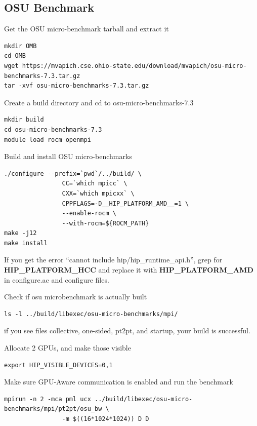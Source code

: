 \documentclass[
]{article}
\begin{document}
\hypertarget{osu-benchmark}{%
\subsection{OSU Benchmark}\label{osu-benchmark}}

Get the OSU micro-benchmark tarball and extract it

\begin{verbatim}
mkdir OMB
cd OMB
wget https://mvapich.cse.ohio-state.edu/download/mvapich/osu-micro-benchmarks-7.3.tar.gz
tar -xvf osu-micro-benchmarks-7.3.tar.gz
\end{verbatim}

Create a build directory and cd to osu-micro-benchmarks-7.3

\begin{verbatim}
mkdir build
cd osu-micro-benchmarks-7.3
module load rocm openmpi
\end{verbatim}

Build and install OSU micro-benchmarks

\begin{verbatim}
./configure --prefix=`pwd`/../build/ \
                CC=`which mpicc` \
                CXX=`which mpicxx` \
                CPPFLAGS=-D__HIP_PLATFORM_AMD__=1 \
                --enable-rocm \
                --with-rocm=${ROCM_PATH}
make -j12
make install
\end{verbatim}

If you get the error ``cannot include hip/hip\_runtime\_api.h'', grep
for \textbf{HIP\_PLATFORM\_HCC} and replace it with
\textbf{HIP\_PLATFORM\_AMD} in configure.ac and configure files.

Check if osu microbenchmark is actually built

\begin{verbatim}
ls -l ../build/libexec/osu-micro-benchmarks/mpi/
\end{verbatim}

if you see files collective, one-sided, pt2pt, and startup, your build
is successful.

Allocate 2 GPUs, and make those visible

\begin{verbatim}
export HIP_VISIBLE_DEVICES=0,1
\end{verbatim}

Make sure GPU-Aware communication is enabled and run the benchmark

\begin{verbatim}
mpirun -n 2 -mca pml ucx ../build/libexec/osu-micro-benchmarks/mpi/pt2pt/osu_bw \
                -m $((16*1024*1024)) D D
\end{verbatim}
\end{document}
